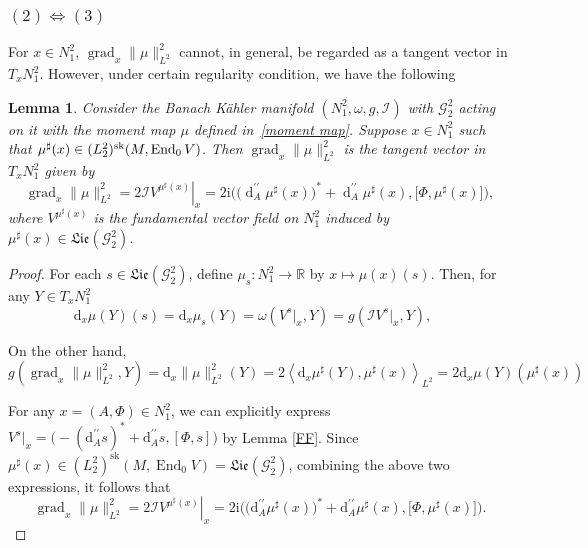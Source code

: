 \documentclass[a4paper]{amsart}
\newtheorem{lemma}[theorem]{Lemma}
\theoremstyle{definition}
\theoremstyle{remark}
\numberwithin{equation}{section}
\begin{document}
\subsubsection{$(2) \Leftrightarrow (3)$}
For $x \in N_1^2$, $\operatorname{grad}_x \|\mu\|_{L^2}^2$ cannot, in general, be regarded as a tangent vector in $T_x N_1^2$. However, under certain regularity condition, we have the following

\begin{lemma}\label{grad}
Consider the Banach K\" ahler manifold $(N_1^2, \omega, g, \mathcal{I})$ with $\mathscr{G}_2^2$ acting on it with the moment map $\mu$ defined in~\eqref{moment map}. Suppose $x \in N_1^2$ such that $\mu^\sharp(x) \in (L_2^2)^{\rm sk}(M, \operatorname{End}_0 V)$. Then $\operatorname{grad}_x \|\mu\|^2_{L^2}$ is the tangent vector in $T_x N_1^2$ given by
\[
\operatorname{grad}_x \|\mu\|^2_{L^2} = \left. 2\mathcal{I} V^{\mu^\sharp(x)} \right|_x = 2\mathrm{i} \Big( \big( \operatorname{d}_A^{\prime\prime} \mu^\sharp(x) \big)^* + \operatorname{d}_A^{\prime\prime} \mu^\sharp(x), \big[\Phi, \mu^\sharp(x)\big] \Big),
\]
where $V^{\mu^\sharp(x)}$ is the fundamental vector field on $N_1^2$ induced by $\mu^\sharp(x) \in \mathfrak{Lie}(\mathscr{G}_2^2)$.
\end{lemma}

\begin{proof}
For each $s \in \mathfrak{Lie}(\mathscr{G}_2^2)$, define $\mu_s: N_1^2 \to \mathbb{R}$ by $x \mapsto \mu(x)(s)$. Then, for any $Y \in T_x N_1^2$
\[
\mathrm{d}_x\mu(Y)(s) = \mathrm{d}_x\mu_s(Y) = \omega(V^s\big|_x, Y) = g(\mathcal{I}V^s\big|_x, Y), \quad
\]

On the other hand,
\[
g\left(\operatorname{grad}_x \|\mu\|^2_{L^2}, Y\right) = \mathrm{d}_x\|\mu\|^2_{L^2}(Y) = 2 \left\langle \mathrm{d}_x\mu^\sharp(Y), \mu^\sharp(x) \right\rangle_{L^2} = 2 \mathrm{d}_x\mu(Y)\left(\mu^\sharp(x)\right)
\]

For any $x = (A, \Phi) \in N_1^2$, we can explicitly express $V^s\big|_x = \Big(- (\mathrm{d}_A^{\prime\prime}s)^* + \mathrm{d}_A^{\prime\prime}s, [\Phi, s]\Big)$ by Lemma \ref{FF}. Since $\mu^\sharp(x) \in (L_2^2)^{\text{sk}}(M, \operatorname{End}_0 V) = \mathfrak{Lie}(\mathscr{G}_2^2)$, combining the above two expressions, it follows that
\[
\operatorname{grad}_x \|\mu\|^2_{L^2} = \left.2\mathcal{I} V^{\mu^\sharp(x)}\right|_x = 2\mathrm{i}\Big(\big(\mathrm{d}_A^{\prime\prime} \mu^\sharp(x)\big)^* + \mathrm{d}_A^{\prime\prime} \mu^\sharp(x), \big[\Phi, \mu^\sharp(x)\big]\Big).
\]
\end{proof}
\end{document}
